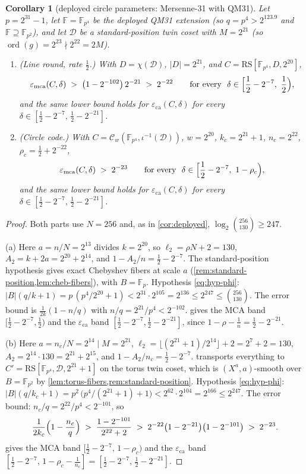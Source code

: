 \documentclass[11pt]{article}
\newtheorem{corollary}[theorem]{Corollary}
\theoremstyle{definition}
\theoremstyle{remark}
\newcommand{\F}{\mathbb{F}}
\newcommand{\B}{B}
\newcommand{\RS}{\mathrm{RS}}
\newcommand{\eca}{\varepsilon_{\mathrm{ca}}}
\newcommand{\emca}{\varepsilon_{\mathrm{mca}}}
\begin{document}
\begin{corollary}[deployed circle parameters: Mersenne-31 with QM31]\label{cor:circle-deployed}
Let $p=2^{31}-1$, let $\F=\F_{p^4}$ be the deployed QM31 extension \textup(so $q=p^4>2^{123.9}$ and $\F\supseteq\F_{p^2}$\textup), and let $\mathcal D$ be a standard-position twin coset with $M=2^{21}$ \textup(so $\operatorname{ord}(g)=2^{23}\nmid2^{22}=2M$\textup).
\begin{enumerate}[label=\textup{(\alph*)}]
\item \textup{(Line round, rate $\frac12$.)} With $D=\chi(\mathcal D)$, $|D|=2^{21}$, and $C=\RS[\F_{p^4},D,2^{20}]$,
\[
\emca(C,\delta)\;>\;\bigl(1-2^{-102}\bigr)\,2^{-21}\;>\;2^{-22}
\qquad\text{for every }\ \delta\in\Bigl[\frac12-2^{-7},\ \frac12\Bigr),
\]
and the same lower bound holds for $\eca(C,\delta)$ for every $\delta\in[\frac12-2^{-7},\,\frac12-2^{-21}]$.
\item \textup{(Circle code.)} With $C=\mathcal C_w(\F_{p^4},\iota^{-1}(\mathcal D))$, $w=2^{20}$, $k_c=2^{21}+1$, $n_c=2^{22}$, $\rho_c=\frac12+2^{-22}$,
\[
\emca(C,\delta)\;>\;2^{-23}
\qquad\text{for every }\ \delta\in\Bigl[\frac12-2^{-7},\ 1-\rho_c\Bigr),
\]
and the same lower bound holds for $\eca(C,\delta)$ for every $\delta\in[\frac12-2^{-7},\,\frac12-2^{-21}]$.
\end{enumerate}
\end{corollary}

\begin{proof}
Both parts use $N=256$ and, as in \cref{cor:deployed}, $\log_2\binom{256}{130}\ge247$.

(a) Here $a=n/N=2^{13}$ divides $k=2^{20}$, so $\ell_2=\rho N+2=130$, $A_2=k+2a=2^{20}+2^{14}$, and $1-A_2/n=\frac12-2^{-7}$. The standard-position hypothesis gives exact Chebyshev fibers at scale $a$ (\cref{rem:standard-position,lem:cheb-fibers}), with $\B=\F_p$. Hypothesis \eqref{eq:hyp-phi}: $|\B|(q/k+1)=p\,(p^4/2^{20}+1)<2^{31}\cdot2^{105}=2^{136}\le2^{247}\le\binom{256}{130}$. The error bound is $\frac1{2k}(1-n/q)$ with $n/q=2^{21}/p^4<2^{-102}$.  gives the MCA band $[\frac12-2^{-7},\frac12)$ and the $\eca$ band $[\frac12-2^{-7},\frac12-2^{-21}]$, since $1-\rho-\frac1n=\frac12-2^{-21}$.

(b) Here $a=n_c/N=2^{14}\mid M=2^{21}$, $\ell_2=\lfloor(2^{21}+1)/2^{14}\rfloor+2=2^7+2=130$, $A_2=2^{14}\cdot130=2^{21}+2^{15}$, and $1-A_2/n_c=\frac12-2^{-7}$.  transports everything to $C'=\RS[\F_{p^4},\mathcal D,2^{21}+1]$ on the torus twin coset, which is $(X^a,a)$-smooth over $\B=\F_{p^2}$ by \cref{lem:torus-fibers,rem:standard-position}. Hypothesis \eqref{eq:hyp-phi}: $|\B|(q/k_c+1)=p^2\,\bigl(p^4/(2^{21}+1)+1\bigr)<2^{62}\cdot2^{104}=2^{166}\le2^{247}$. The error bound: $n_c/q=2^{22}/p^4<2^{-101}$, so
\[
\frac1{2k_c}\Bigl(1-\frac{n_c}q\Bigr)\;>\;\frac{1-2^{-101}}{2^{22}+2}\;>\;2^{-22}\bigl(1-2^{-21}\bigr)\bigl(1-2^{-101}\bigr)\;>\;2^{-23}.
\]
 gives the MCA band $[\frac12-2^{-7},\,1-\rho_c)$ and the $\eca$ band $[\frac12-2^{-7},\,1-\rho_c-\frac1{n_c}]=[\frac12-2^{-7},\,\frac12-2^{-21}]$.
\end{proof}
\end{document}
